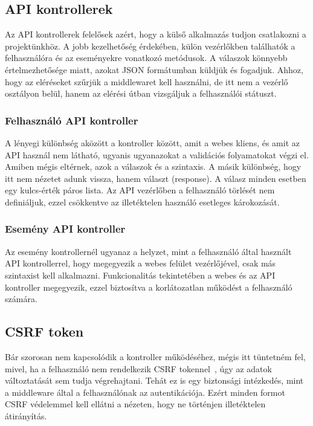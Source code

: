 \documentclass[
]{thesis-ekf}
\theoremstyle{definition}
\theoremstyle{remark}
\begin{document}
	\subsection{API kontrollerek}
	Az API kontrollerek felelősek azért, hogy a külső alkalmazás tudjon csatlakozni a projektünkhöz. A jobb kezelhetőség érdekében, külön vezérlőkben találhatók a felhasználóra és az eseményekre vonatkozó metódusok. A válaszok könnyebb értelmezhetősége miatt, azokat JSON formátumban küldjük és fogadjuk. Ahhoz, hogy az eléréseket szűrjük a middlewaret kell használni, de itt nem a vezérlő osztályon belül, hanem az elérési útban vizsgáljuk a felhasználói státuszt.
	
	\subsubsection{Felhasználó API kontroller}
	A lényegi különbség aközött a kontroller között, amit a webes kliens, és amit az API használ nem látható, ugyanis ugyanazokat a validációs folyamatokat végzi el. Amiben mégis eltérnek, azok a válaszok és a szintaxis. A másik különbség, hogy itt nem nézetet adunk vissza, hanem választ (response). A válasz minden esetben egy kulcs-érték páros lista.
	Az API vezérlőben a felhasználó törlését nem definiáljuk, ezzel csökkentve az illetéktelen használó esetleges károkozását. 
	
	\subsubsection{Esemény API kontroller}
	Az esemény kontrollernél ugyanaz a helyzet, mint a felhasználó által használt API kontrollerrel, hogy megegyezik a webes felület vezérlőjével, csak más szintaxist kell alkalmazni. Funkcionalitás tekintetében a webes és az API kontroller megegyezik, ezzel biztosítva a korlátozatlan működést a felhasználó számára.
	
	\subsection{CSRF token}
	Bár szorosan nem kapcsolódik a kontroller működéséhez, mégis itt tüntetném fel, mivel, ha a felhasználó nem rendelkezik CSRF tokennel~\cite{laravel_csrf}, úgy az adatok változtatását sem tudja végrehajtani. Tehát ez is egy biztonsági intézkedés, mint a middleware által a felhasználónak az autentikációja. Ezért minden formot CSRF védelemmel kell ellátni a nézeten, hogy ne történjen illetéktelen átirányítás.
	
\end{document}

